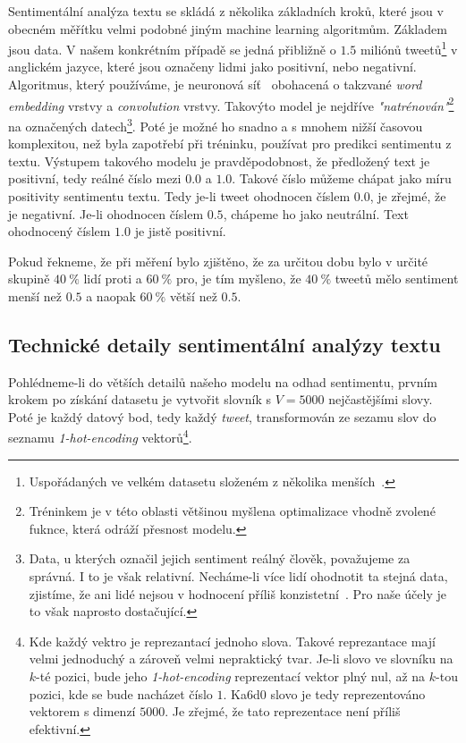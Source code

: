 \documentclass[12pt, a4paper]{article}
\numberwithin{equation}{section} 	%
\begin{document}
Sentimentální analýza textu se skládá z několika základních kroků, které jsou v obecném měřítku velmi podobné jiným machine learning algoritmům. Základem jsou data. V našem konkrétním případě se jedná přibližně o $1.5$ miliónů tweetů\footnote{Uspořádaných ve velkém datasetu složeném z několika menších~\cite{TwitterData1, TwitterData2}.} v anglickém jazyce, které jsou označeny lidmi jako positivní, nebo negativní. Algoritmus, který používáme, je neuronová síť~\cite{TwitterSentAnalysis} obohacená o takzvané \textit{word embedding} vrstvy a \textit{convolution} vrstvy. Takovýto model je nejdříve \textit{"natrénován"}\footnote{Tréninkem je v této oblasti většinou myšlena optimalizace vhodně zvolené fuknce, která odráží přesnost modelu.} na označených datech\footnote{Data, u kterých označil jejich sentiment reálný člověk, považujeme za správná. I to je však relativní. Necháme-li více lidí ohodnotit ta stejná data, zjistíme, že ani lidé nejsou v hodnocení příliš konzistetní~\cite{HumanVsMachineLearning}. Pro naše účely je to však naprosto dostačující.}. Poté je možné ho snadno a s mnohem nižší časovou komplexitou, než byla zapotřebí při tréninku, používat pro predikci sentimentu z textu. Výstupem takového modelu je pravděpodobnost, že předložený text je positivní, tedy reálné číslo mezi $0.0$ a $1.0$. Takové číslo můžeme chápat jako míru positivity sentimentu textu. Tedy je-li tweet ohodnocen číslem $0.0$, je zřejmé, že je negativní. Je-li ohodnocen číslem $0.5$, chápeme ho jako neutrální. Text ohodnocený číslem $1.0$ je jistě positivní.

Pokud řekneme, že při měření bylo zjištěno, že za určitou dobu bylo v určité skupině $40~\%$ lidí proti a $60~\%$ pro, je tím myšleno, že $40~\%$ tweetů mělo sentiment menší než $0.5$ a naopak $60~\%$ větší než $0.5$.

\subsection{Technické detaily sentimentální analýzy textu}
\noindent Pohlédneme-li do větších detailů našeho modelu na odhad sentimentu, prvním krokem po získání datasetu je vytvořit slovník s $V = 5000$ nejčastějšími slovy. Poté je každý datový bod, tedy každý \textit{tweet}, transformován ze sezamu slov do seznamu \textit{1-hot-encoding} vektorů\footnote{Kde každý vektro je reprezantací jednoho slova. Takové reprezantace mají velmi jednoduchý a zároveň velmi nepraktický tvar. Je-li slovo ve slovníku na $k$-té pozici, bude jeho \textit{1-hot-encoding} reprezentací vektor plný nul, až na $k$-tou pozici, kde se bude nacházet číslo $1$. Ka6d0 slovo je tedy reprezentováno vektorem s dimenzí $5000$. Je zřejmé, že tato reprezentace není příliš efektivní.}.
\end{document}

